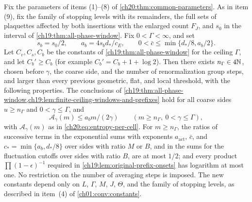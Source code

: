 \begin{lemma}\label{ch20:lem:unrestricted-window-onsets}
Fix the parameters of items \textup{(1)}--\textup{(8)} of \cref{ch20:thm:common-parameters}. As in item \textup{(9)}, fix the family of stopping levels with its remainders, the full sets of plaquettes affected by both insertions with the enlarged count $F_J$, and $s_0$ in the interval of \cref{ch19:thm:all-phase-window}. Fix $0<\Gamma<\infty$, and set
\[
 s_b=s_0/2,\qquad a_b=4s_bd_*/c_E,\qquad 0<\bar c\le\min\{d_*/8,a_b/2\}.
\]
Let $C_v,C_s,C_b$ be the constants of \cref{ch19:thm:all-phase-window} for the ceiling $\Gamma$, and let $C_b'\ge C_b$ (for example $C_b'=C_b+1+\log2$). Then there exists $n_\Gamma\in4\mathbb N$, chosen before $\gamma$, the coarse side, and the number of renormalization group steps, and larger than every previous geometric, flat, and local threshold, with the following properties. The conclusions of \cref{ch19:thm:all-phase-window,ch19:lem:finite-ceiling-windows-and-prefixes} hold for all coarse sides $u\ge n_\Gamma$ and $0<\gamma\le\Gamma$, and
\[
 \mathcal A_\gamma(m)\le a_bm/(2\gamma)\qquad(m\ge n_\Gamma,\ 0<\gamma\le\Gamma),
\]
with $\mathcal A_\gamma(m)$ as in \eqref{ch20:eq:entropy-per-cell}. For $m\ge n_\Gamma$, the ratios of successive terms in the exponential sums with exponents $a_{\mathrm{act}}$, $\bar c$, and $c_*=\min\{a_b,d_*/8\}$ over sides with ratio $M$ or $B$, and in the sums for the fluctuation cutoffs over sides with ratio $B$, are at most $1/2$; and every product $\prod(1-\epsilon)^{-1}$ required in \cref{ch19:lem:original-prefix-onsets} has logarithm at most one. No restriction on the number of averaging steps is imposed. The new constants depend only on $L$, $\Gamma$, $M$, $J$, $\Theta$, and the family of stopping levels, as described in item~\textup{(4)} of \cref{ch01:conv:constants}.
\end{lemma}

